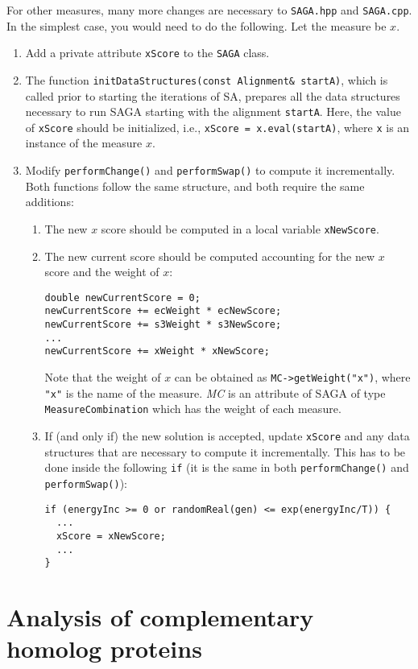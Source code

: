 \documentclass[]{article}
\begin{document}
For other measures, many more changes are necessary to \texttt{SAGA.hpp} and \texttt{SAGA.cpp}. In the simplest case, you would need to do the following. Let the measure be $x$.
\begin{enumerate}
\item Add a private attribute \texttt{xScore} to the \texttt{SAGA} class.
\item The function \texttt{initDataStructures(const Alignment\& startA)}, which is called prior to starting the iterations of SA, prepares all the data structures necessary to run SAGA starting with the alignment \texttt{startA}. Here, the value of \texttt{xScore} should be initialized, i.e., \texttt{xScore = x.eval(startA)}, where \texttt{x} is an instance of the measure $x$.
\item Modify \texttt{performChange()} and \texttt{performSwap()} to compute it incrementally. Both functions follow the same structure, and both require the same additions:
\begin{enumerate}
\item The new $x$ score should be computed in a local variable \texttt{xNewScore}.
\item The new current score should be computed accounting for the new $x$ score and the weight of $x$:
\begin{verbatim}
double newCurrentScore = 0;
newCurrentScore += ecWeight * ecNewScore;
newCurrentScore += s3Weight * s3NewScore;
...
newCurrentScore += xWeight * xNewScore;
\end{verbatim}
Note that the weight of $x$ can be obtained as \texttt{MC->getWeight("x")}, where \texttt{"x"} is the name of the measure. \emph{MC} is an attribute of SAGA of type \texttt{MeasureCombination} which has the weight of each measure.
\item If (and only if) the new solution is accepted, update \texttt{xScore} and any data structures that are necessary to compute it incrementally. This has to be done inside the following \texttt{if} (it is the same in both \texttt{performChange()} and \texttt{performSwap()}):
\begin{verbatim}
if (energyInc >= 0 or randomReal(gen) <= exp(energyInc/T)) {
  ...
  xScore = xNewScore;
  ...
}
\end{verbatim}
\end{enumerate}
\end{enumerate}


\section{Analysis of complementary homolog proteins}
\end{document}
